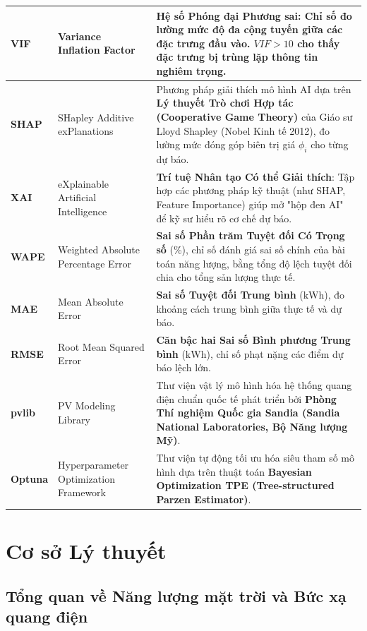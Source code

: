\documentclass[12pt,a4paper]{article}
\begin{document}
\begin{table}[H]
\begin{tabularx}{\linewidth}{|l|l|X|}
\textbf{VIF} & Variance Inflation Factor & \textbf{Hệ số Phóng đại Phương sai}: Chỉ số đo lường mức độ đa cộng tuyến giữa các đặc trưng đầu vào. $VIF > 10$ cho thấy đặc trưng bị trùng lặp thông tin nghiêm trọng. \\ \hline
\textbf{SHAP} & SHapley Additive exPlanations & Phương pháp giải thích mô hình AI dựa trên \textbf{Lý thuyết Trò chơi Hợp tác (Cooperative Game Theory)} của Giáo sư Lloyd Shapley (Nobel Kinh tế 2012), đo lường mức đóng góp biên trị giá $\phi_i$ cho từng dự báo. \\ \hline
\textbf{XAI} & eXplainable Artificial Intelligence & \textbf{Trí tuệ Nhân tạo Có thể Giải thích}: Tập hợp các phương pháp kỹ thuật (như SHAP, Feature Importance) giúp mở "hộp đen AI" để kỹ sư hiểu rõ cơ chế dự báo. \\ \hline
\textbf{WAPE} & Weighted Absolute Percentage Error & \textbf{Sai số Phần trăm Tuyệt đối Có Trọng số} (\%), chỉ số đánh giá sai số chính của bài toán năng lượng, bằng tổng độ lệch tuyệt đối chia cho tổng sản lượng thực tế. \\ \hline
\textbf{MAE} & Mean Absolute Error & \textbf{Sai số Tuyệt đối Trung bình} ($\text{kWh}$), đo khoảng cách trung bình giữa thực tế và dự báo. \\ \hline
\textbf{RMSE} & Root Mean Squared Error & \textbf{Căn bậc hai Sai số Bình phương Trung bình} ($\text{kWh}$), chỉ số phạt nặng các điểm dự báo lệch lớn. \\ \hline
\textbf{pvlib} & PV Modeling Library & Thư viện vật lý mô hình hóa hệ thống quang điện chuẩn quốc tế phát triển bởi \textbf{Phòng Thí nghiệm Quốc gia Sandia (Sandia National Laboratories, Bộ Năng lượng Mỹ)}. \\ \hline
\textbf{Optuna} & Hyperparameter Optimization Framework~\cite{optuna2019} & Thư viện tự động tối ưu hóa siêu tham số mô hình dựa trên thuật toán \textbf{Bayesian Optimization TPE (Tree-structured Parzen Estimator)}. \\ \hline
\end{tabularx}
\end{table}



\section{Cơ sở Lý thuyết}
\label{chap:lythuyet}

\subsection{Tổng quan về Năng lượng mặt trời và Bức xạ quang điện}
\label{sec:solar_theory}
\end{document}
